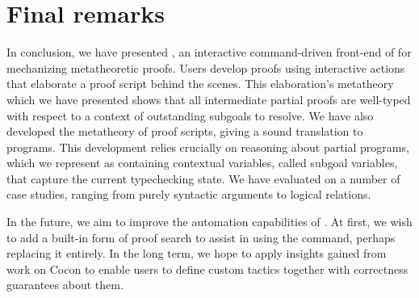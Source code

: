 
\section{Final remarks}

In conclusion, we have presented \Harpoon, an interactive command-driven
front-end of \Beluga{} for mechanizing metatheoretic proofs.
Users develop proofs using interactive actions that elaborate a proof script
behind the scenes.
This elaboration's metatheory which we have presented shows that all
intermediate partial proofs are well-typed with respect to a context of
outstanding subgoals to resolve.
We have also developed the metatheory of proof scripts, giving a sound
translation to \Beluga{} programs.
This development relies crucially on reasoning about partial programs, which we
represent as containing contextual variables, called subgoal variables, that
capture the current typechecking state.
We have evaluated \Harpoon{} on a number of case studies, ranging from purely
syntactic arguments to logical relations.

In the future, we aim to improve the automation capabilities of \Harpoon.
At first, we wish to add a built-in form of proof search to assist in using the
\ttsolves command, perhaps replacing it entirely. In the long term, we hope to
apply insights gained from work on Cocon \cite{cocon} to enable users to define
custom tactics together with correctness guarantees about them.

